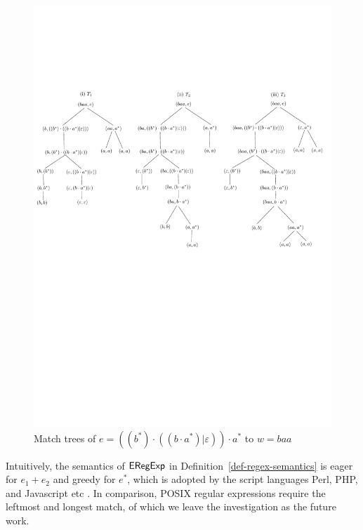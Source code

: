 \begin{example}
\begin{figure}[ht]
\includegraphics[scale=0.7]{regex-semantics.pdf}
\caption{Match trees of $e=((b^\ast) \cdot ((b \cdot a^\ast) | \varepsilon)) \cdot a^\ast$ to $w= baa$}
\label{fig-regex-semantics}
\end{figure}
 \end{example}
  
\begin{remark}
Intuitively, the semantics of ${\sf ERegExp}$ in Definition~\ref{def-regex-semantics} is eager for $e_1 + e_2$ and greedy for $e^\ast$, which is adopted by the script languages Perl, PHP, and Javascript etc \cite{MasterREbook}. In comparison, POSIX regular expressions require the leftmost and longest match, of which we leave the investigation as the future work. 
\end{remark}
  
  
  
%  
